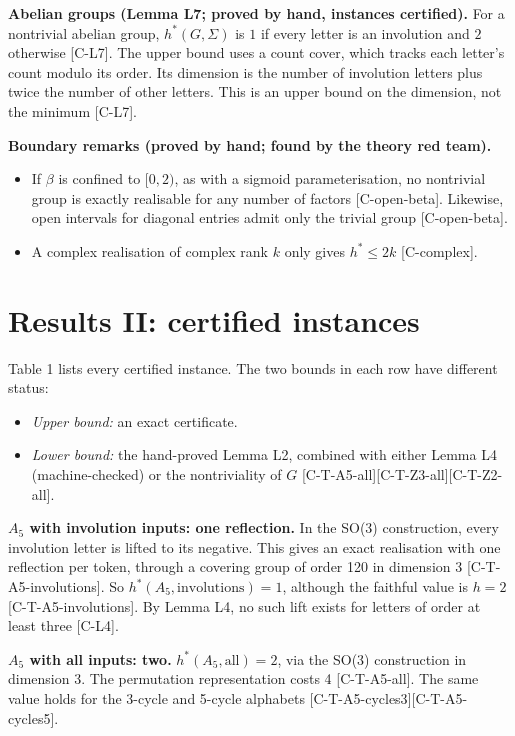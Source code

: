 \documentclass[10pt,twocolumn,a4paper]{article}
\providecommand{\tightlist}{\setlength{\itemsep}{0pt}\setlength{\parskip}{0pt}}
\begin{document}
\textbf{Abelian groups (Lemma L7; proved by hand, instances certified).} For a nontrivial abelian group, \(h^*(G,\Sigma)\) is \(1\) if every letter is an involution and \(2\) otherwise {[}C-L7{]}. The upper bound uses a count cover, which tracks each letter's count modulo its order. Its dimension is the number of involution letters plus twice the number of other letters. This is an upper bound on the dimension, not the minimum {[}C-L7{]}.

\textbf{Boundary remarks (proved by hand; found by the theory red team).}

\begin{itemize}
\tightlist
\item
  If \(\beta\) is confined to \([0, 2)\), as with a sigmoid parameterisation, no nontrivial group is exactly realisable for any number of factors {[}C-open-beta{]}. Likewise, open intervals for diagonal entries admit only the trivial group {[}C-open-beta{]}.
\item
  A complex realisation of complex rank \(k\) only gives \(h^* \le 2k\) {[}C-complex{]}.
\end{itemize}

\section{Results II: certified instances}\label{results-ii-certified-instances}

Table 1 lists every certified instance. The two bounds in each row have different status:

\begin{itemize}
\tightlist
\item
  \emph{Upper bound:} an exact certificate.
\item
  \emph{Lower bound:} the hand-proved Lemma L2, combined with either Lemma L4 (machine-checked) or the nontriviality of \(G\) {[}C-T-A5-all{]}{[}C-T-Z3-all{]}{[}C-T-Z2-all{]}.
\end{itemize}

\textbf{\(A_5\) with involution inputs: one reflection.} In the SO(3) construction, every involution letter is lifted to its negative. This gives an exact realisation with one reflection per token, through a covering group of order 120 in dimension 3 {[}C-T-A5-involutions{]}. So \(h^*(A_5,\text{involutions}) = 1\), although the faithful value is \(h = 2\) {[}C-T-A5-involutions{]}. By Lemma L4, no such lift exists for letters of order at least three {[}C-L4{]}.

\textbf{\(A_5\) with all inputs: two.} \(h^*(A_5,\text{all}) = 2\), via the SO(3) construction in dimension 3. The permutation representation costs 4 {[}C-T-A5-all{]}. The same value holds for the 3-cycle and 5-cycle alphabets {[}C-T-A5-cycles3{]}{[}C-T-A5-cycles5{]}.
\end{document}
